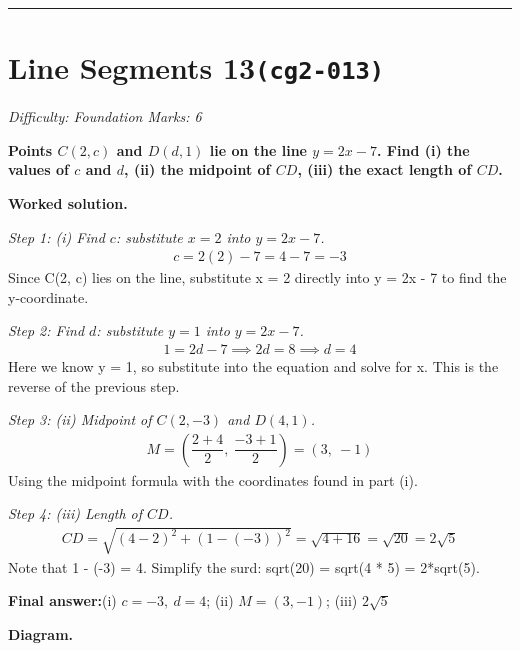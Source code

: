 \documentclass[11pt]{article}
\newcommand{\question}[1]{\par\medskip\noindent\textbf{#1}\par}
\begin{document}
\medskip\hrule

\section*{Line Segments 13\quad\small\texttt{(cg2-013)}}
\textit{Difficulty: Foundation \quad\textbar\quad Marks: 6}

\question{Points \( C(2, c) \) and \( D(d, 1) \) lie on the line \( y = 2x - 7 \). Find (i) the values of \( c \) and \( d \), (ii) the midpoint of \( CD \), (iii) the exact length of \( CD \).}

\textbf{Worked solution.}

\textit{Step 1: (i) Find \( c \): substitute \( x = 2 \) into \( y = 2x - 7 \).}
\[\begin{gathered}
c = 2(2) - 7 = 4 - 7 = -3
\end{gathered}\]
Since C(2, c) lies on the line, substitute x = 2 directly into y = 2x - 7 to find the y-coordinate.

\textit{Step 2: Find \( d \): substitute \( y = 1 \) into \( y = 2x - 7 \).}
\[\begin{gathered}
1 = 2d - 7 \implies 2d = 8 \implies d = 4
\end{gathered}\]
Here we know y = 1, so substitute into the equation and solve for x. This is the reverse of the previous step.

\textit{Step 3: (ii) Midpoint of \( C(2, -3) \) and \( D(4, 1) \).}
\[\begin{gathered}
M = \left(\dfrac{2 + 4}{2},\ \dfrac{-3 + 1}{2}\right) = (3,\ -1)
\end{gathered}\]
Using the midpoint formula with the coordinates found in part (i).

\textit{Step 4: (iii) Length of \( CD \).}
\[\begin{gathered}
CD = \sqrt{(4-2)^2 + (1-(-3))^2} = \sqrt{4 + 16} = \sqrt{20} = 2\sqrt{5}
\end{gathered}\]
Note that 1 - (-3) = 4. Simplify the surd: sqrt(20) = sqrt(4 * 5) = 2*sqrt(5).

\begin{answerbox}
\textbf{Final answer:}\quad (i) \(\displaystyle c = -3,\ d = 4\); (ii) \(\displaystyle M = (3, -1)\); (iii) \(\displaystyle 2\sqrt{5}\)
\end{answerbox}
\textbf{Diagram.}
\end{document}
